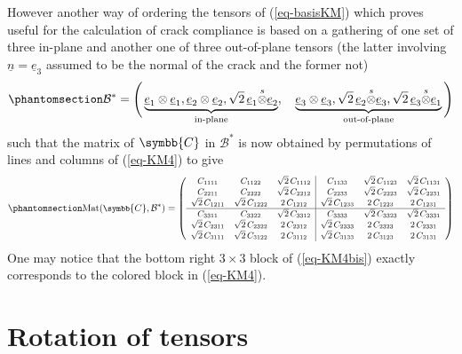 \documentclass[
  a4paper,
  numbers=noendperiod,
  DIV=12]{scrreprt}
\newcommand{\uuuu}[1]{{\symbb{{#1}}}}
\newcommand{\uv}[1]{{\underline{{#1}}}}
\newcommand{\ve}[1]{{\uv{{e}}_{{#1}}}}
\newcommand{\n}{{\uv{{n}}}}
\newcommand{\sotimes}{{\stackrel{s}{\otimes}}}
\DeclareMathOperator{\Mat}{Mat}
\begin{document}
However another way of ordering the tensors of (\ref{eq-basisKM}) which
proves useful for the calculation of crack compliance is based on a
gathering of one set of three in-plane and another one of three
out-of-plane tensors (the latter involving \(\n=\ve{3}\) assumed to be
the normal of the crack and the former not)
\begin{equation}\phantomsection\label{eq-basisKM2}{
\mathcal{B}^*=\Bigg(
\underbrace{
\ve{1}\otimes\ve{1},
\ve{2}\otimes\ve{2},
\sqrt{2}\,\ve{1}\sotimes\ve{2}
}_{\textrm{in-plane}},
\quad
\underbrace{
\ve{3}\otimes\ve{3},
\sqrt{2}\,\ve{2}\sotimes\ve{3},
\sqrt{2}\,\ve{3}\sotimes\ve{1}
}_{\textrm{out-of-plane}}
\Bigg)
}\end{equation} such that the matrix of \(\uuuu{C}\) in
\(\mathcal{B}^*\) is now obtained by permutations of lines and columns
of (\ref{eq-KM4}) to give
\begin{equation}\phantomsection\label{eq-KM4bis}{
\small
\Mat(\uuuu{C},\mathcal{B}^*)=
   \left(
   \begin{array}{ccc|ccc}
   C_{1111} & C_{1122} & \sqrt{2}\,C_{1112} & C_{1133} & \sqrt{2}\,C_{1123} & \sqrt{2}\,C_{1131} \\
   C_{2211} & C_{2222} & \sqrt{2}\,C_{2212} & C_{2233} & \sqrt{2}\,C_{2223} & \sqrt{2}\,C_{2231} \\
   \sqrt{2}\,C_{1211} & \sqrt{2}\,C_{1222} & 2\,C_{1212} & \sqrt{2}\,C_{1233} & 2\,C_{1223} & 2\,C_{1231} \\
   \hline
   C_{3311} & C_{3322} & \sqrt{2}\,C_{3312} & C_{3333} & \sqrt{2}\,C_{3323} & \sqrt{2}\,C_{3331} \\
   \sqrt{2}\,C_{2311} & \sqrt{2}\,C_{2322} & 2\,C_{2312} & \sqrt{2}\,C_{2333} & 2\,C_{2323} & 2\,C_{2331} \\
   \sqrt{2}\,C_{3111} & \sqrt{2}\,C_{3122} & 2\,C_{3112} & \sqrt{2}\,C_{3133} & 2\,C_{3123} & 2\,C_{3131}
   \end{array}
   \right)
}\end{equation} One may notice that the bottom right \(3\times 3\) block
of (\ref{eq-KM4bis}) exactly corresponds to the colored block in
(\ref{eq-KM4}).

\section{Rotation of tensors}\label{sec-rottens}
\end{document}
